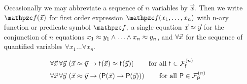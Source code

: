 \begin{definition}
	Occasionally we may abbreviate a sequence of $n$ variables by $\vec{x}$.
	Then we write $\mcf(\vecn{x})$ 
	for first order expression $\mcf(x_1,\ldots,x_n)$
	with n-ary function or predicate symbol $\mcf$,
	a single equation $\vec{x}\approx\vec{y}$ for
	the conjunction of $n$ equations 
	$x_1\approx y_1\land\ldots\land x_n\approx y_n$,
	and $\forall\vec{x}$ for 
	the sequence of quantified variables $\forall x_1\ldots\forall x_n$.
\end{definition}

\begin{definition}
	\label{def:congruence:schemata}
	\begin{align*}
	\forall\vecn{x}\,\forall\vecn{y}\,
	&\left(\vecn{x}\mEQ\vecn{y} \limp \mf(\vecn{x}) \mEQ \mf(\vecn{y}) \right)
	\tag*{for all $\mf\in\mcFfn$}
	\\
	\forall\vecn{x}\,\forall\vecn{y}\, 
	&\left(\vecn{x}\mEQ\vecn{y} \limp (\mP(\vecn{x}) \limp \mP(\vecn{y}))\right)
	\tag*{for all $\mP\in\mcFPn$}
	\end{align*}
	
	
\end{definition}

